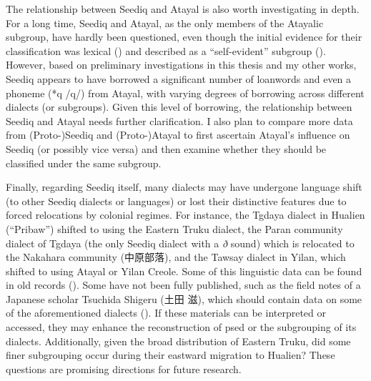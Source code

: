 The relationship between Seediq and Atayal is also worth investigating in depth. For a long time, Seediq and Atayal, as the only members of the Atayalic subgroup, have hardly been questioned, even though the initial evidence for their classification was lexical (\cite{ferrell1969}) and described as a ``self-evident'' subgroup (\cite{blust1999subgrouping}). However, based on preliminary investigations in this thesis and my other works, Seediq appears to have borrowed a significant number of loanwords and even a phoneme (*q /q/) from Atayal, with varying degrees of borrowing across different dialects (or subgroups). Given this level of borrowing, the relationship between Seediq and Atayal needs further clarification. I also plan to compare more data from (Proto-)Seediq and (Proto-)Atayal to first ascertain Atayal's influence on Seediq (or possibly vice versa) and then examine whether they should be classified under the same subgroup.

Finally, regarding Seediq itself, many dialects may have undergone language shift (to other Seediq dialects or languages) or lost their distinctive features due to forced relocations by colonial regimes. For instance, the Tgdaya dialect in Hualien (``Pribaw'') shifted to using the Eastern Truku dialect, the Paran community dialect of Tgdaya (the only Seediq dialect with a \textit{ð} sound) which is relocated to the Nakahara community (中原部落), and the Tawsay dialect in Yilan, which shifted to using Atayal or Yilan Creole. Some of this linguistic data can be found in old records (\cite{tashiro1900easterntw, bullock1874formosan}). Some have not been fully published, such as the field notes of a Japanese scholar Tsuchida Shigeru (土田 滋), which should contain data on some of the aforementioned dialects (\cite{li2022tsuchida}). If these materials can be interpreted or accessed, they may enhance the reconstruction of \acl{psed} or the subgrouping of its dialects. Additionally, given the broad distribution of Eastern Truku, did some finer subgrouping occur during their eastward migration to Hualien? These questions are promising directions for future research.